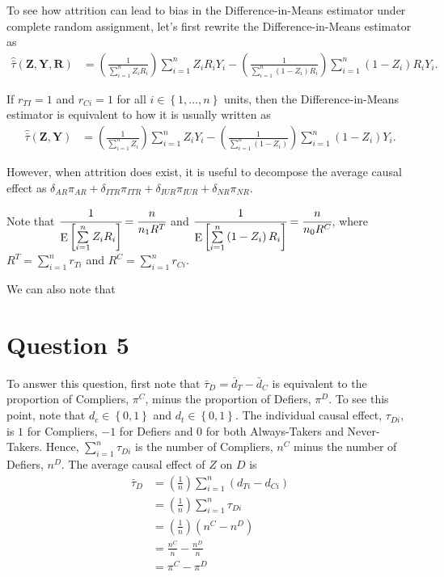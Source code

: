 \documentclass[
  12pt,
  leqno]{article}
\DeclareMathOperator{\E}{\mathrm{E}}
\DeclareMathOperator{\1}{\mathbbm{1}}
\begin{document}
To see how attrition can lead to bias in the Difference-in-Means
estimator under complete random assignment, let's first rewrite the
Difference-in-Means estimator as \begin{align*}
\hat{\bar{\tau}}\left(\mathbf{Z}, \mathbf{Y}, \mathbf{R}\right) & = \left(\frac{1}{\sum \limits_{i = 1}^n Z_i R_i}\right) \sum \limits_{i = 1}^n Z_i R_i Y_i - \left(\frac{1}{\sum \limits_{i = 1}^n \left(1 - Z_i\right)R_i}\right) \sum \limits_{i = 1}^n \left(1 - Z_i\right) R_i Y_i.
\end{align*}

If \(r_{TI} = 1\) and \(r_{Ci} = 1\) for all
\(i \in \left\{1, \dots , n\right\}\) units, then the
Difference-in-Means estimator is equivalent to how it is usually written
as \begin{align*}
\hat{\bar{\tau}}\left(\mathbf{Z}, \mathbf{Y}\right) & = \left(\frac{1}{\sum \limits_{i = 1}^n Z_i}\right) \sum \limits_{i = 1}^n Z_i Y_i - \left(\frac{1}{\sum \limits_{i = 1}^n \left(1 - Z_i\right)}\right) \sum \limits_{i = 1}^n \left(1 - Z_i\right) Y_i.
\end{align*}

However, when attrition does exist, it is useful to decompose the
average causal effect as
\(\delta_{AR}\pi_{AR} + \delta_{ITR} \pi_{ITR} + \delta_{IUR}\pi_{IUR} + \delta_{NR} \pi_{NR}\).

Note that
\(\cfrac{1}{\E\left[\sum\limits_{i = 1}^n Z_i R_i\right]} = \cfrac{n}{n_1 R^T}\)
and
\(\cfrac{1}{\E\left[\sum\limits_{i = 1}^n \left(1 - Z_i\right) R_i\right]} = \cfrac{n}{n_0 R^C}\),
where \(R^T = \sum \limits_{i = 1}^n r_{Ti}\) and
\(R^C = \sum \limits_{i = 1}^n r_{Ci}\).

We can also note that

\section*{Question 5}

To answer this question, first note that
\(\bar{\tau}_D = \bar{d}_T - \bar{d}_C\) is equivalent to the proportion
of Compliers, \(\pi^C\), minus the proportion of Defiers, \(\pi^D\). To
see this point, note that \(d_c \in \left\{0, 1\right\}\) and
\(d_t \in \left\{0, 1\right\}\). The individual causal effect,
\(\tau_{Di}\), is \(1\) for Compliers, \(-1\) for Defiers and \(0\) for
both Always-Takers and Never-Takers. Hence,
\(\sum \limits_{i = 1}^n \tau_{Di}\) is the number of Compliers, \(n^C\)
minus the number of Defiers, \(n^D\). The average causal effect of \(Z\)
on \(D\) is \begin{align*}
\bar{\tau}_D & = \left(\frac{1}{n}\right)\sum \limits_{i = 1}^n \left(d_{Ti} - d_{Ci}\right) \\
& = \left(\frac{1}{n}\right) \sum \limits_{i = 1}^n \tau_{Di} \\
& = \left(\frac{1}{n}\right)\left(n^C - n^D\right) \\ 
& = \frac{n^C}{n} - \frac{n^D}{n}\\ 
& = \pi^C - \pi^D
\end{align*}
\end{document}
